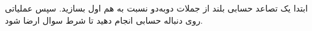 ابتدا یک تصاعد حسابی بلند از جملات دو‌به‌دو نسبت به هم اول بسازید. سپس عملیاتی روی دنباله حسابی انجام دهید تا شرط سوال ارضا شود.